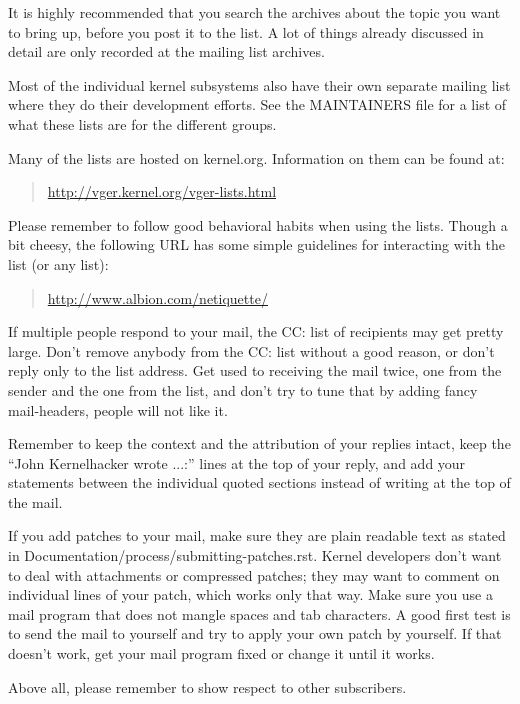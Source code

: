 \documentclass[a4paper,8pt,english]{sphinxmanual}
\begin{document}
It is highly recommended that you search the archives about the topic
you want to bring up, before you post it to the list. A lot of things
already discussed in detail are only recorded at the mailing list
archives.

Most of the individual kernel subsystems also have their own separate
mailing list where they do their development efforts.  See the
MAINTAINERS file for a list of what these lists are for the different
groups.

Many of the lists are hosted on kernel.org. Information on them can be
found at:
\begin{quote}

\href{http://vger.kernel.org/vger-lists.html}{http://vger.kernel.org/vger-lists.html}
\end{quote}

Please remember to follow good behavioral habits when using the lists.
Though a bit cheesy, the following URL has some simple guidelines for
interacting with the list (or any list):
\begin{quote}

\href{http://www.albion.com/netiquette/}{http://www.albion.com/netiquette/}
\end{quote}

If multiple people respond to your mail, the CC: list of recipients may
get pretty large. Don't remove anybody from the CC: list without a good
reason, or don't reply only to the list address. Get used to receiving the
mail twice, one from the sender and the one from the list, and don't try
to tune that by adding fancy mail-headers, people will not like it.

Remember to keep the context and the attribution of your replies intact,
keep the ``John Kernelhacker wrote ...:'' lines at the top of your reply, and
add your statements between the individual quoted sections instead of
writing at the top of the mail.

If you add patches to your mail, make sure they are plain readable text
as stated in Documentation/process/submitting-patches.rst.
Kernel developers don't want to deal with
attachments or compressed patches; they may want to comment on
individual lines of your patch, which works only that way. Make sure you
use a mail program that does not mangle spaces and tab characters. A
good first test is to send the mail to yourself and try to apply your
own patch by yourself. If that doesn't work, get your mail program fixed
or change it until it works.

Above all, please remember to show respect to other subscribers.
\end{document}

